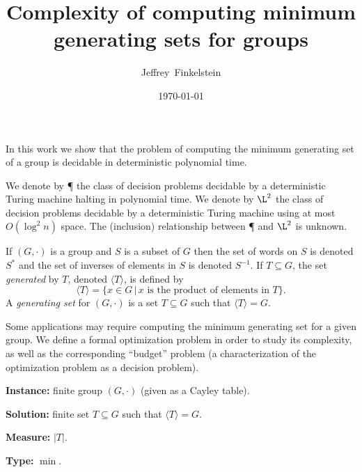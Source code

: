 \documentclass[]{article}
\title{Complexity of computing minimum generating sets for groups}
\author{Jef{}frey~Finkelstein}
\date{\today}
\newcommand{\gen}[1]{{\langle #1 \rangle}}
\begin{document}
\maketitle

In this work we show that the problem of computing the minimum generating set of a group is decidable in deterministic polynomial time.


We denote by \P{} the class of decision problems decidable by a deterministic Turing machine halting in polynomial time.
We denote by $\L^2$ the class of decision problems decidable by a deterministic Turing machine using at most $O(\log^2 n)$ space.
The (inclusion) relationship between \P{} and $\L^2$ is unknown.

If $(G, \cdot)$ is a group and $S$ is a subset of $G$ then the set of words on $S$ is denoted $S^*$ and the set of inverses of elements in $S$ is denoted $S^{-1}$.
If $T \subseteq G$, the set \emph{generated} by $T$, denoted $\gen{T}$, is defined by
\begin{equation*}
  \gen{T} = \{ x \in G \, | \, x \text{ is the product of elements in } T \}.
\end{equation*}
A \emph{generating set} for $(G, \cdot)$ is a set $T \subseteq G$ such that $\gen{T} = G$.

Some applications may require computing the minimum generating set for a given group.
We define a formal optimization problem in order to study its complexity, as well as the corresponding ``budget'' problem (a characterization of the optimization problem as a decision problem).

\begin{definition}
  \mbox{}

  \textbf{Instance:} finite group $(G, \cdot)$ (given as a Cayley table).

  \textbf{Solution:} finite set $T \subseteq G$ such that $\gen{T} = G$.

  \textbf{Measure:} $|T|$.

  \textbf{Type:} $\min$.
\end{definition}
\end{document}
